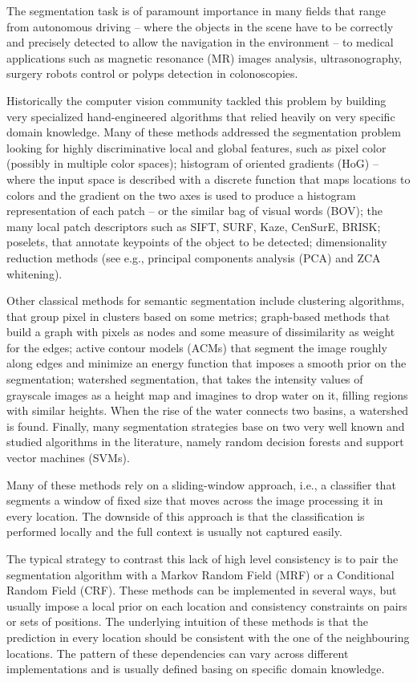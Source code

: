 The segmentation task is of paramount importance in many fields that range
from autonomous driving -- where the objects in the scene have to be correctly
and precisely detected to allow the navigation in the environment -- to medical
applications such as magnetic resonance (MR) images analysis, ultrasonography,
surgery robots control or polyps detection in colonoscopies.

Historically the computer vision community tackled this problem by building
very specialized hand-engineered algorithms that relied heavily on very
specific domain knowledge. Many of these methods addressed the segmentation
problem looking for highly discriminative local and global features, such as
pixel color (possibly in multiple color spaces); histogram of oriented
gradients (HoG) -- where the input space is described with a discrete function
that maps locations to colors and the gradient on the two axes is used to
produce a histogram representation of each patch -- or the similar bag of
visual words (BOV); the many local patch descriptors such as SIFT, SURF, Kaze,
CenSurE, BRISK; poselets, that annotate keypoints of the object to be detected;
dimensionality reduction methods (see e.g., principal components analysis (PCA)
and ZCA whitening).

Other classical methods for semantic segmentation include clustering
algorithms, that group pixel in clusters based on some metrics; graph-based
methods that build a graph with pixels as nodes and some measure of
dissimilarity as weight for the edges; active contour models (ACMs) that
segment the image roughly along edges and minimize an energy function that
imposes a smooth prior on the segmentation; watershed segmentation, that takes
the intensity values of grayscale images as a height map and imagines to drop
water on it, filling regions with similar heights. When the rise of the
water connects two basins, a watershed is found. Finally, many segmentation
strategies base on two very well known and studied algorithms in the
literature, namely random decision forests and support vector machines (SVMs).

Many of these methods rely on a sliding-window approach, i.e., a classifier
that segments a window of fixed size that moves across the image processing it
in every location. The downside of this approach is that the classification is
performed locally and the full context is usually not captured easily.

The typical strategy to contrast this lack of high level consistency is to pair the
segmentation algorithm with a Markov Random Field (MRF) or a Conditional Random
Field (CRF). These methods can be implemented in several ways, but usually
impose a local prior on each location and consistency constraints on pairs or
sets of positions. The underlying intuition of these methods is that the
prediction in every location should be consistent with the one of the
neighbouring locations. The pattern of these dependencies can vary across
different implementations and is usually defined basing on specific domain
knowledge.

